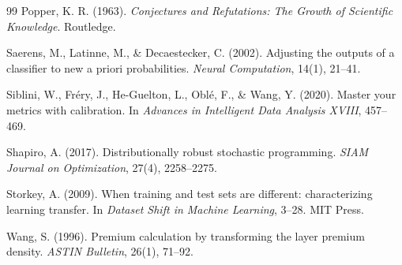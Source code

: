 \documentclass[11pt]{article}
\theoremstyle{remark}
\begin{document}
\begin{thebibliography}{99}
Popper, K. R. (1963).
\emph{Conjectures and Refutations: The Growth of Scientific Knowledge}.
Routledge.

Saerens, M., Latinne, M., \& Decaestecker, C. (2002).
Adjusting the outputs of a classifier to new a priori probabilities.
\emph{Neural Computation}, 14(1), 21--41.

Siblini, W., Fr\'ery, J., He-Guelton, L., Obl\'e, F., \& Wang, Y. (2020).
Master your metrics with calibration.
In \emph{Advances in Intelligent Data Analysis XVIII}, 457--469.

Shapiro, A. (2017).
Distributionally robust stochastic programming.
\emph{SIAM Journal on Optimization}, 27(4), 2258--2275.

Storkey, A. (2009).
When training and test sets are different: characterizing learning transfer.
In \emph{Dataset Shift in Machine Learning}, 3--28. MIT Press.

Wang, S. (1996).
Premium calculation by transforming the layer premium density.
\emph{ASTIN Bulletin}, 26(1), 71--92.

\end{thebibliography}
\end{document}
